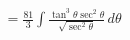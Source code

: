 \documentclass[preview]{standalone}
\begin{document}
\begin{align*}
&= \frac{81}{3}\int \frac{\tan^3\theta\sec^2\theta}{\sqrt{\sec^2\theta}} \, d\theta \\
\end{align*}
\end{document}
